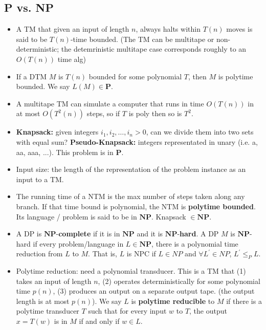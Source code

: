 \subsection{\color{ForestGreen}P vs. NP}
\begin{itemize}
    \item A TM that given an input of length \( n \), always halts within \( T(n) \) moves is said to be \( T(n) \)-time bounded. (The TM can be multitape or non-deterministic; the detemrinistic multitape case corresponds roughly to an \( O(T(n)) \) time alg)
    \item If a DTM \( M \) is \( T(n) \) bounded for some polynomial \( T \), then \( M \) is polytime bounded. We say \( L(M) \in \mathbf{P} \).
    \item A multitape TM can simulate a computer that runs in time \( O(T(n)) \) in at most \( O(T^{2} (n)) \) steps, so if \( T \) is poly then so is \( T^{2}. \) 
    \item \textbf{Knapsack:} given integers \( i_1, i_2, \hdots , i_{n} > 0 \), can we divide them into two sets with equal sum? \textbf{Pseudo-Knapsack:} integers representated in unary (i.e. a, aa, aaa, ...). This problem is in \( \mathbf{P} \). 
    \item Input size: the length of the representation of the problem instance as an input to a TM.
    \item The running time of a NTM is the max number of steps taken along any branch. If that time bound is polynomial, the NTM is \textbf{polytime bounded}. Its language / problem is said to be in \( \mathbf{NP} \). Knapsack \( \in \mathbf{NP} \).
    \item A DP is \( \mathbf{NP} \)-\textbf{complete} if it is in \( \mathbf{NP} \) and it is \( \mathbf{NP} \)-\textbf{hard}. A DP \( M \) is \( \mathbf{NP} \)-hard if every problem/language in \( L \in \mathbf{NP} \), there is a polynomial time reduction from \( L \) to \( M \). That is, $L$ is NPC if $L\in NP$ and $\forall L^\prime \in NP$, $L^\prime \leq_P L$.
    \item Polytime reduction: need a polynomial transducer. This is a TM that (1) takes an input of length \( n \), (2) operates deterministically for some polynomial time \( p(n) \), (3) produces an output on a separate output tape. (the output length is at most \( p(n) \)). We say \( L \) is \textbf{polytime reducible} to \( M \) if there is a polytime transducer \( T \) such that for every input \( w \) to \( T \), the output \( x = T(w) \) is in \( M \) if and only if \( w \in L \). 
    
\end{itemize}
